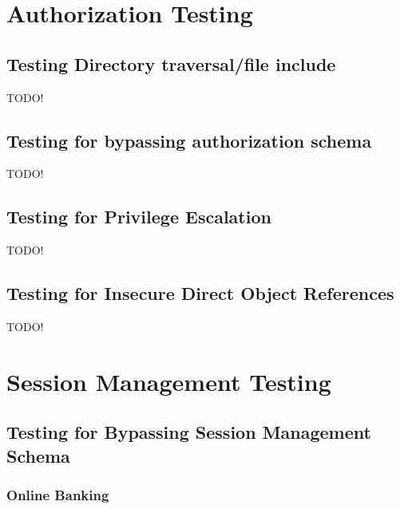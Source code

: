\clearpage

\section{Authorization Testing}

\subsection{Testing Directory traversal/file include}
TODO!
\subsection{Testing for bypassing authorization schema}
TODO!
\subsection{Testing for Privilege Escalation}
TODO!
\subsection{Testing for Insecure Direct Object References}
TODO!









\section{Session Management Testing}

\subsection{Testing for Bypassing Session Management Schema}

\subsubsection*{Online Banking}

